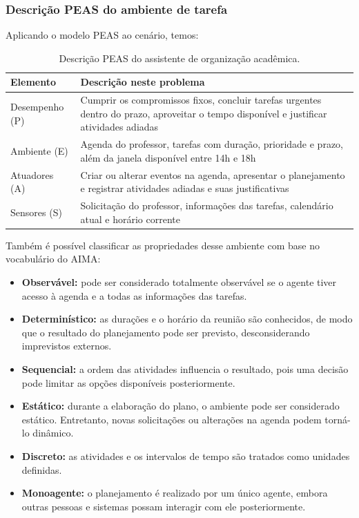 \documentclass[12pt, a4paper]{article}
\begin{document}
\subsubsection{Descrição PEAS do ambiente de tarefa}

Aplicando o modelo PEAS ao cenário, temos:

\begin{table}[H]
  \centering
  \small
  \caption{Descrição PEAS do assistente de organização acadêmica.}
  \label{tab:q11_peas}
  \begin{tabular}{@{}p{2.6cm}p{11.0cm}@{}}
    \toprule
    \textbf{Elemento} & \textbf{Descrição neste problema} \\
    \midrule
    Desempenho (P\allowbreak ) & Cumprir os compromissos fixos, concluir tarefas urgentes dentro do prazo, aproveitar o tempo dis\-po\-ní\-vel e justificar atividades adiadas \\
    Ambiente (E\allowbreak ) & Agenda do professor, tarefas com duração, prioridade e prazo, além da janela dis\-po\-ní\-vel entre 14h e 18h \\
    Atuadores (A\allowbreak ) & Criar ou alterar eventos na agenda, apresentar o planejamento e registrar atividades adiadas e suas justificativas \\
    Sensores (S\allowbreak ) & So\-li\-ci\-ta\-ção do professor, in\-for\-ma\-ções das tarefas, ca\-len\-dá\-rio atual e horário corrente \\
    \bottomrule
  \end{tabular}
\end{table}

Também é possível classificar as propriedades desse ambiente com base no vocabulário do AIMA:
\begin{itemize}[leftmargin=2em]
  \item \textbf{Observável:} pode ser considerado totalmente observável se o agente tiver acesso à agenda e a todas as informações das tarefas.
  \item \textbf{Determinístico:} as durações e o horário da reunião são conhecidos, de modo que o resultado do planejamento pode ser previsto, desconsiderando imprevistos externos.
  \item \textbf{Sequencial:} a ordem das atividades influencia o resultado, pois uma decisão pode limitar as opções disponíveis posteriormente.
  \item \textbf{Estático:} durante a elaboração do plano, o ambiente pode ser considerado estático. Entretanto, novas solicitações ou alterações na agenda podem torná-lo dinâmico.
  \item \textbf{Discreto:} as atividades e os intervalos de tempo são tratados como unidades definidas.
  \item \textbf{Monoagente:} o planejamento é realizado por um único agente, embora outras pessoas e sistemas possam interagir com ele posteriormente.
\end{itemize}
\end{document}
